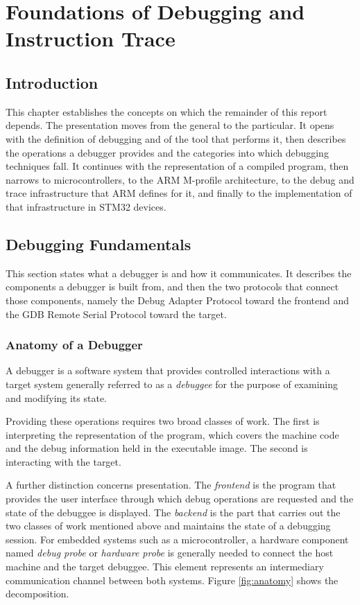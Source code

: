 \chapter{Foundations of Debugging and Instruction Trace}

\section*{Introduction}
This chapter establishes the concepts on which the remainder of this report depends. The presentation moves from the general to the particular. It opens with the definition of debugging and of the tool that performs it, then describes the operations a debugger provides and the categories into which debugging techniques fall. It continues with the representation of a compiled program, then narrows to microcontrollers, to the ARM M-profile architecture, to the debug and trace infrastructure that ARM defines for it, and finally to the implementation of that infrastructure in STM32 devices.

\section{Debugging Fundamentals}
\label{sec:fundamentals}

This section states what a debugger is and how it communicates. It describes the components a debugger is built from, and then the two protocols that connect those components, namely the Debug Adapter Protocol toward the frontend and the GDB Remote Serial Protocol toward the target.

\subsection{Anatomy of a Debugger}
\label{subsec:anatomy}
A debugger is a software system that provides controlled interactions with a target system generally referred to as a \textit{debuggee} for the purpose of examining and modifying its state.

Providing these operations requires two broad classes of work. The first is interpreting the representation of the program, which covers the machine code and the debug information held in the executable image. The second is interacting with the target.

A further distinction concerns presentation. The \textit{frontend} is the program that provides the user interface through which debug operations are requested and the state of the debuggee is displayed. The \textit{backend} is the part that carries out the two classes of work mentioned above and maintains the state of a debugging session. For embedded systems such as a microcontroller, a hardware component named \textit{debug probe} or \textit{hardware probe} is generally needed to connect the host machine and the target debuggee. This element represents an intermediary communication channel between both systems. Figure \ref{fig:anatomy} shows the decomposition.

